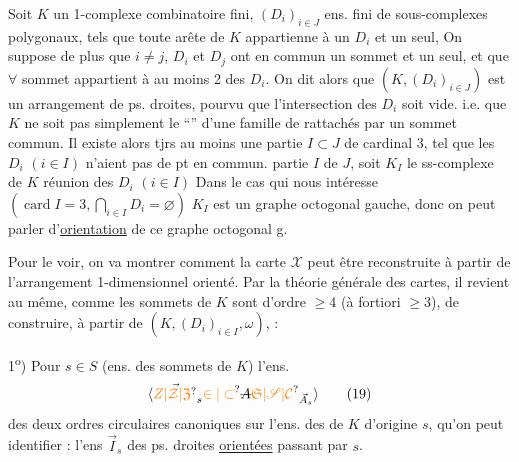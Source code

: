 Soit $K$ un 1-complexe combinatoire fini,
$(D_i)_{i\in J}$   ens. fini de sous-complexes
polygonaux, tels que toute arête de $K$ appartienne
à un $D_i$ et un seul,  On
suppose de plus que  $i\ne j$, $D_i$ et $D_j$
ont en commun un sommet et un
seul, et que $\forall$ sommet  appartient à au
moins 2 des $D_i$. On dit alors que
$(K,(D_i)_{i\in J})$ est un arrangement  de ps. droites,
\deleted{\unsure{$\forall$}} pourvu que l'intersection des $D_i$ soit vide.
i.e. que $K$ ne soit pas simplement le ``''
d'une famille de 
rattachés par un sommet  commun. Il existe alors
tjrs au moins une partie $I\subset J$ de cardinal
3, tel que les $D_i$ $(i\in I)$ n'aient
pas de pt en commun.  
%
  partie $I$ de $J$, soit $K_I$ le ss-complexe
de $K$  réunion des $D_i$ $(i\in I)$
%
Dans le cas qui nous intéresse $(\operatorname{card} I=3,
\bigcap_{i\in I}D_i=\varnothing)$  $K_I$ est un graphe
octogonal gauche, donc on peut parler
d'\uline{orientation} de ce graphe octogonal g.

Pour le voir, on va montrer comment la
carte $\mathcal X$ peut être reconstruite à partir de
l'arrangement 1-dimensionnel orienté. Par la
théorie générale des cartes, il revient au même,
 comme les sommets de $K$ sont d'ordre
$\geq4$ (\deleted{\unsure{$\geq$}}à fortiori $\geq3$), de construire, à partir
de $(K,(D_i)_{i\in I},\omega)$, :

1\textsuperscript{o}) Pour  $s\in S$ (ens. des sommets de $K$) 
l'ens. \[\inserted{\vec{\unsure{Z|\mathcal Z|\mathfrak Z}}_s\unsure{\in|\subset}\deleted{A}{\unsure{\mathfrak S|\mathscr S|\mathcal C}}_{\vec A_s}}\tag*{(19)}\] des deux ordres circulaires 
canoniques sur l'ens.  des  de $K$ d'origine
$s$, qu'on peut identifier   : l'ens
$\vec I_s$ des ps. droites \uline{orientées}  passant par $s$.

